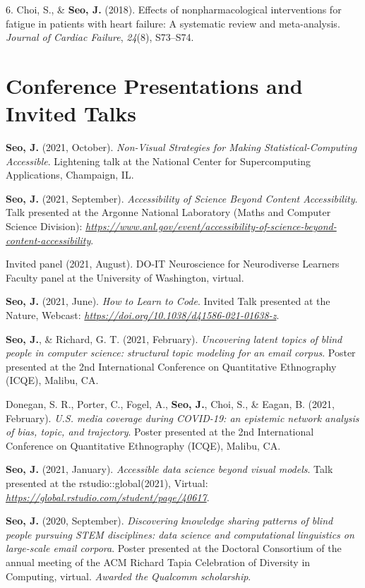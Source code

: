 \documentclass[11pt,a4paper,]{awesome-cv}
\begin{document}
\leavevmode{}%
6. Choi, S., \& \textbf{Seo, J.} (2018). Effects of nonpharmacological
interventions for fatigue in patients with heart failure: A systematic
review and meta-analysis. \emph{Journal of Cardiac Failure},
\emph{24}(8), S73--S74.

\hypertarget{conference-presentations-and-invited-talks}{%
\section{Conference Presentations and Invited
Talks}\label{conference-presentations-and-invited-talks}}

\textbf{Seo, J.} (2021, October). \emph{Non-Visual Strategies for Making
Statistical-Computing Accessible}. Lightening talk at the National
Center for Supercomputing Applications, Champaign, IL.

\textbf{Seo, J.} (2021, September). \emph{Accessibility of Science
Beyond Content Accessibility}. Talk presented at the Argonne National
Laboratory (Maths and Computer Science Division):
\emph{\url{https://www.anl.gov/event/accessibility-of-science-beyond-content-accessibility}}.

Invited panel (2021, August). DO-IT Neuroscience for Neurodiverse
Learners Faculty panel at the University of Washington, virtual.

\textbf{Seo, J.} (2021, June). \emph{How to Learn to Code}. Invited Talk
presented at the Nature, Webcast:
\emph{\url{https://doi.org/10.1038/d41586-021-01638-z}}.

\textbf{Seo, J.}, \& Richard, G. T. (2021, February). \emph{Uncovering
latent topics of blind people in computer science: structural topic
modeling for an email corpus}. Poster presented at the 2nd International
Conference on Quantitative Ethnography (ICQE), Malibu, CA.

Donegan, S. R., Porter, C., Fogel, A., \textbf{Seo, J.}, Choi, S., \&
Eagan, B. (2021, February). \emph{U.S. media coverage during COVID-19:
an epistemic network analysis of bias, topic, and trajectory}. Poster
presented at the 2nd International Conference on Quantitative
Ethnography (ICQE), Malibu, CA.

\textbf{Seo, J.} (2021, January). \emph{Accessible data science beyond
visual models}. Talk presented at the rstudio::global(2021), Virtual:
\emph{\url{https://global.rstudio.com/student/page/40617}}.

\textbf{Seo, J.} (2020, September). \emph{Discovering knowledge sharing
patterns of blind people pursuing STEM disciplines: data science and
computational linguistics on large-scale email corpora}. Poster
presented at the Doctoral Consortium of the annual meeting of the ACM
Richard Tapia Celebration of Diversity in Computing, virtual.
\emph{Awarded the Qualcomm scholarship}.
\end{document}

